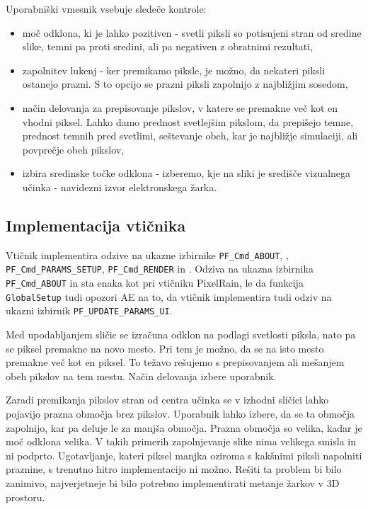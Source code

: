 \documentclass[a4paper, 12pt]{book}
\begin{document}
Uporabniški vmesnik vsebuje sledeče kontrole:
\begin{itemize}
\item{moč odklona, ki je lahko pozitiven - svetli piksli so potisnjeni stran od sredine slike, temni pa proti sredini, ali pa negativen z obratnimi rezultati,}
\item{zapolnitev lukenj - ker premikamo piksle, je možno, da nekateri piksli ostanejo prazni. S to opcijo se prazni piksli zapolnijo z najbližjim sosedom,}
\item{način delovanja za prepisovanje pikslov, v katere se premakne več kot en vhodni piksel. Lahko damo prednost svetlejšim pikslom, da prepišejo temne,
	prednost temnih pred svetlimi, seštevanje obeh, kar je najbližje simulaciji, ali povprečje obeh pikslov,}
\item{izbira sredinske točke odklona - izberemo, kje na sliki je središče vizualnega učinka - navidezni izvor elektronskega žarka.}
\end{itemize}

\subsection{Implementacija vtičnika}

Vtičnik implementira odzive na ukazne izbirnike \verb!PF_Cmd_ABOUT!, , \verb!PF_Cmd_PARAMS_SETUP!,
\verb!PF_Cmd_RENDER! in .
Odziva na ukazna izbirnika \verb!PF_Cmd_ABOUT! in  sta enaka kot pri vtičniku PixelRain, le da funkcija \verb!GlobalSetup! tudi
opozori AE na to, da vtičnik implementira tudi odziv na ukazni izbirnik \verb!PF_UPDATE_PARAMS_UI!.

Med upodabljanjem sličic se izračuna odklon na podlagi svetlosti piksla, nato pa se piksel premakne na novo mesto.
Pri tem je možno, da se na isto mesto premakne več kot en piksel.
To težavo rešujemo s prepisovanjem ali mešanjem obeh pikslov na tem mestu.
Način delovanja izbere uporabnik.

Zaradi premikanja pikslov stran od centra učinka se v izhodni sličici lahko pojavijo prazna območja brez pikslov.
Uporabnik lahko izbere, da se ta območja zapolnijo, kar pa deluje le za manjša območja. 
Prazna območja so velika, kadar je moč odklona velika. 
V takih primerih zapolnjevanje slike nima velikega smisla in ni podprto.
Ugotavljanje, kateri piksel manjka oziroma s kakšnimi piksli napolniti praznine, s trenutno hitro implementacijo ni možno.
Rešiti ta problem bi bilo zanimivo, najverjetneje bi bilo potrebno implementirati metanje žarkov v 3D prostoru.
\end{document}
